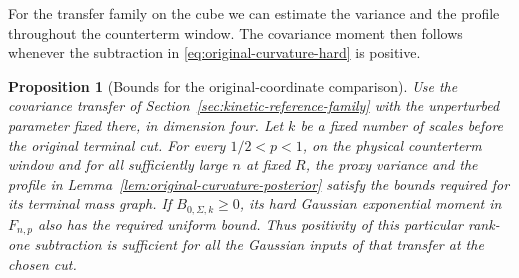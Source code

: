 \documentclass[11pt]{article}
\newtheorem{proposition}[theorem]{Proposition}
\theoremstyle{definition}
\begin{document}
For the transfer family on the cube we can estimate the variance
and the profile throughout the counterterm window. The covariance
moment then follows whenever the subtraction in
\eqref{eq:original-curvature-hard} is positive.

\begin{proposition}[Bounds for the original-coordinate comparison]
\label{prop:original-curvature-comparison-bounds}
Use the covariance transfer of Section~\ref{sec:kinetic-reference-family}
with the unperturbed parameter fixed there, in dimension four.
Let \(k\) be a fixed number of scales before the original terminal
cut. For every \(1/2<p<1\), on the physical counterterm window and
for all sufficiently large \(n\) at fixed \(R\), the proxy variance
and the profile in Lemma~\ref{lem:original-curvature-posterior}
satisfy the bounds required for its terminal mass graph. If
\(B_{0,\Sigma,k}\ge0\), its hard Gaussian exponential moment in
\(F_{n,p}\) also has the required uniform bound. Thus positivity of
this particular rank-one subtraction is sufficient for all the
Gaussian inputs of that transfer at the chosen cut.
\end{proposition}
\end{document}

